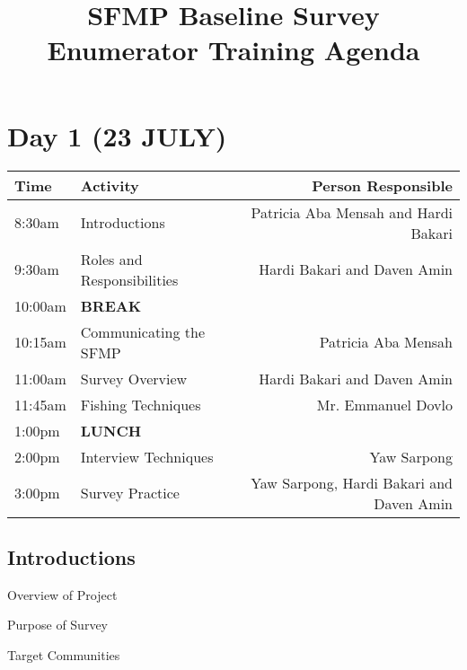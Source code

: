 \documentclass[a4paper,agenda,11pt]{meetingmins}
\begin{document}
\title{SFMP Baseline Survey Enumerator Training Agenda}

\maketitle

\section{Day 1 (23 JULY)}


\begin{tabularx}{\textwidth}{| l | X | r |} \hline
Time & Activity & Person Responsible \\ \hline \hline
8:30am &
Introductions &
Patricia Aba Mensah and Hardi Bakari \\ \hline

9:30am &
Roles and Responsibilities &
Hardi Bakari and Daven Amin \\ \hline

10:00am &
\textbf{BREAK} &
 \\ \hline

10:15am & 
Communicating the SFMP&
Patricia Aba Mensah \\ \hline

11:00am & 
Survey Overview &
Hardi Bakari and Daven Amin \\ \hline

11:45am & 
Fishing Techniques &
Mr. Emmanuel Dovlo \\ \hline

1:00pm & 
\textbf{LUNCH} &
 \\ \hline

2:00pm &
Interview Techniques &
Yaw Sarpong \\ \hline

3:00pm  & 
Survey Practice & 
Yaw Sarpong, Hardi Bakari and Daven Amin \\ \hline

\end{tabularx}

\subsection{Introductions}
\begin{subitems}
\item Overview of Project
\item Purpose of Survey
\item Target Communities
\end{subitems}
\end{document}
